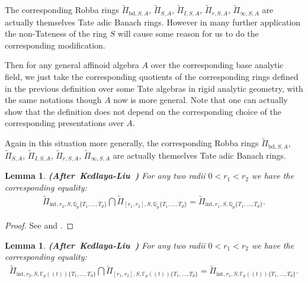 \documentclass[12pt]{amsart}
\newtheorem{lemma}[theorem]{Lemma}
\theoremstyle{definition}
\numberwithin{equation}{section}
\begin{document}
\indent The corresponding Robba rings $\widetilde{\Pi}_{\mathrm{bd},S,A}$, $\widetilde{\Pi}_{S,A}$, $\widetilde{\Pi}_{I,S,A}$, $\widetilde{\Pi}_{r,S,A}$, $\widetilde{\Pi}_{\infty,S,A}$ are actually themselves Tate adic Banach rings. However in many further application the non-Tateness of the ring $S$ will cause some reason for us to do the corresponding modification.	




\indent Then for any general affinoid algebra $A$ over the corresponding base analytic field, we just take the corresponding quotients of the corresponding rings defined in the previous definition over some Tate algebras in rigid analytic geometry, with the same notations though $A$ now is more general. Note that one can actually show that the definition does not depend on the corresponding choice of the corresponding presentations over $A$.





\indent Again in this situation more generally, the corresponding Robba rings $\widetilde{\Pi}_{\mathrm{bd},S,A}$, $\widetilde{\Pi}_{S,A}$, $\widetilde{\Pi}_{I,S,A}$, $\widetilde{\Pi}_{r,S,A}$, $\widetilde{\Pi}_{\infty,S,A}$ are actually themselves Tate adic Banach rings.	






\begin{lemma} \mbox{\bf{(After Kedlaya-Liu \cite[Lemma 5.2.6]{KL2})}}
For any two radii $0<r_1<r_2$ we have the corresponding equality:
\begin{align}
\widetilde{\Pi}_{\mathrm{int},r_2,S,\mathbb{Q}_p\{T_1,...,T_d\}}\bigcap \widetilde{\Pi}_{[r_1,r_2],S,\mathbb{Q}_p\{T_1,...,T_d\}}	=\widetilde{\Pi}_{\mathrm{int},r_1,S,\mathbb{Q}_p\{T_1,...,T_d\}}.
\end{align}

\end{lemma}


\begin{proof}
See \cite[Lemma 5.2.6]{KL2} and \cite[Proposition 2.13]{XT2}.	
\end{proof}



\begin{lemma} \mbox{\bf{(After Kedlaya-Liu \cite[Lemma 5.2.6]{KL2})}}
For any two radii $0<r_1<r_2$ we have the corresponding equality:
\begin{align}
\widetilde{\Pi}_{\mathrm{int},r_2,S,\mathbb{F}_p((t))\{T_1,...,T_d\}}\bigcap \widetilde{\Pi}_{[r_1,r_2],S,\mathbb{F}_p((t))\{T_1,...,T_d\}}	=\widetilde{\Pi}_{\mathrm{int},r_1,S,\mathbb{F}_p((t))\{T_1,...,T_d\}}.
\end{align}

\end{lemma}
\end{document}
